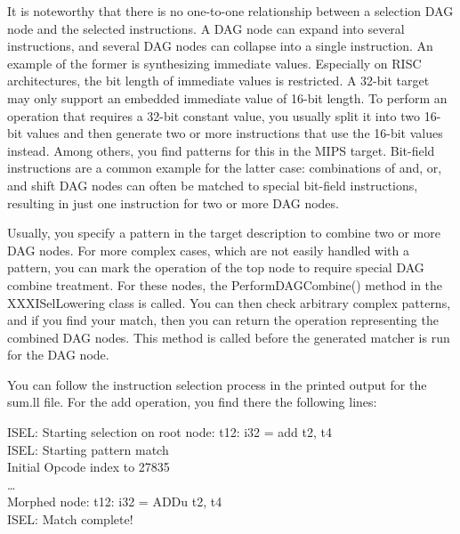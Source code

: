 It is noteworthy that there is no one-to-one relationship between a selection DAG node and the selected instructions. A DAG node can expand into several instructions, and several DAG nodes can collapse into a single instruction. An example of the former is synthesizing immediate values. Especially on RISC architectures, the bit length of immediate values is restricted. A 32-bit target may only support an embedded immediate value of 16-bit length. To perform an operation that requires a 32-bit constant value, you usually split it into two 16-bit values and then generate two or more instructions that use the 16-bit values instead. Among others, you find patterns for this in the MIPS target. Bit-field instructions are a common example for the latter case: combinations of and, or, and shift DAG nodes can often be matched to special bit-field instructions, resulting in just one instruction for two or more DAG nodes.\par

Usually, you specify a pattern in the target description to combine two or more DAG nodes. For more complex cases, which are not easily handled with a pattern, you can mark the operation of the top node to require special DAG combine treatment. For these nodes, the PerformDAGCombine() method in the XXXISelLowering class is called. You can then check arbitrary complex patterns, and if you find your match, then you can return the operation representing the combined DAG nodes. This method is called before the generated matcher is run for the DAG node.\par

You can follow the instruction selection process in the printed output for the sum.ll file. For the add operation, you find there the following lines:\par

\begin{tcolorbox}[colback=white,colframe=black]
ISEL: Starting selection on root node: t12: i32 = add t2, t4 \\
ISEL: Starting pattern match \\
\hspace*{0.5cm}Initial Opcode index to 27835 \\
\hspace*{0.5cm}… \\
\hspace*{0.5cm}Morphed node: t12: i32 = ADDu t2, t4 \\
ISEL: Match complete!
\end{tcolorbox}


